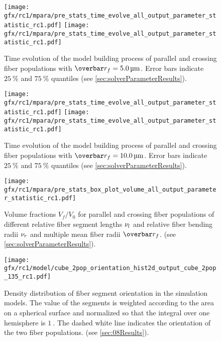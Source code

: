 %
\begin{figure}[!ht]
    \centering
    \begin{sideways}
        \texttt{[image: gfx/rc1/mpara/pre\_stats\_time\_evolve\_all\_output\_parameter\_statistic\_rc1.pdf]}
        \texttt{[image: gfx/rc1/mpara/pre\_stats\_time\_evolve\_all\_output\_parameter\_statistic\_rc1.pdf]}
    \end{sideways}
    \label{app:pste4}
    \caption{Time evolution of the model building process of parallel and crossing fiber populations with $\fiberRadiusMean=\SI{5.0}{\micro\meter}$. Error bars indicate $\SI{25}{\percent}$ and $\SI{75}{\percent}$ quantiles (see \cref{sec:solverParameterResults}).}
\end{figure}
%
\begin{figure}[!ht]
    \centering
    \begin{sideways}
        \texttt{[image: gfx/rc1/mpara/pre\_stats\_time\_evolve\_all\_output\_parameter\_statistic\_rc1.pdf]}
        \texttt{[image: gfx/rc1/mpara/pre\_stats\_time\_evolve\_all\_output\_parameter\_statistic\_rc1.pdf]}
    \end{sideways}
    \label{app:pste5}
    \caption{Time evolution of the model building process of parallel and crossing fiber populations with $\fiberRadiusMean=\SI{10.0}{\micro\meter}$. Error bars indicate $\SI{25}{\percent}$ and $\SI{75}{\percent}$ quantiles (see \cref{sec:solverParameterResults}).}
\end{figure}
% 
\begin{figure}[!ht]
    \centering
    \texttt{[image: gfx/rc1/mpara/pre\_stats\_box\_plot\_volume\_all\_output\_parameter\_statistic\_rc1.pdf]}
    \caption[]{Volume fractions $V_f/V_0$ for parallel \pfbs{} and crossing \cfbs{} fiber populations of different relative fiber segment lengths $\textnormal{$\nu_{l}$}$ and relative fiber bending radii $\textnormal{$\nu_{r}$}$ and multiple mean fiber radii $\fiberRadiusMean$. (see \cref{sec:solverParameterResults}).}
    \label{app:appModelVolumeBoxPlot}
\end{figure}
%
\begin{figure}[!ht]
    \centering
    \texttt{[image: gfx/rc1/model/cube\_2pop\_orientation\_hist2d\_output\_cube\_2pop\_135\_rc1.pdf]}
    \caption[]{Density distribution of fiber segment orientation in the simulation models.
    The value of the segments is weighted according to the area on a spherical surface and normalized so that the integral over one hemisphere is $\SI{1}{}$.
    The dashed white line indicates the orientation of the two fiber populations. (see \cref{sec:08Results}).}
    \label{app:modelOrientation}
\end{figure}

